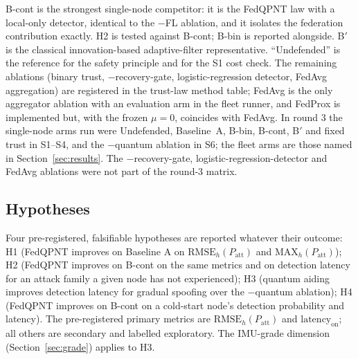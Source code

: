\documentclass[journal]{IEEEtran}
\begin{document}
B-cont is the strongest single-node competitor: it is the FedQPNT law with a local-only detector, identical to
the $-$FL ablation, and it isolates the federation contribution exactly. H2 is tested against B-cont;
B-bin is reported alongside. B$'$ is the classical innovation-based adaptive-filter representative.
``Undefended'' is the reference for the safety principle and for the S1 cost check. The remaining
ablations (binary trust, $-$recovery-gate, logistic-regression detector, FedAvg aggregation) are registered in
the trust-law method table; FedAvg is the only aggregator ablation with an evaluation arm in the fleet
runner, and FedProx is implemented but, with the frozen $\mu = 0$, coincides with FedAvg.
In round 3 the single-node arms run were Undefended, Baseline~A, B-bin, B-cont, B$'$ and fixed trust in S1--S4, and the $-$quantum ablation in S6; the fleet arms are those named in Section~\ref{sec:results}. The $-$recovery-gate, logistic-regression-detector and FedAvg ablations were not part of the round-3 matrix.

\subsection{Hypotheses}
\label{sec:hypotheses}
Four pre-registered, falsifiable hypotheses are reported whatever their outcome:
H1 (FedQPNT improves on Baseline A on $\mathrm{RMSE}_h(P_{\mathrm{att}})$ and $\mathrm{MAX}_h(P_{\mathrm{att}})$);
H2 (FedQPNT improves on B-cont on the same metrics and on detection latency for an attack family a given
node has not experienced); H3 (quantum aiding improves detection latency for gradual spoofing over the
$-$quantum ablation); H4 (FedQPNT improves on B-cont on a cold-start node's detection probability and
latency). The pre-registered primary metrics are $\mathrm{RMSE}_h(P_{\mathrm{att}})$ and
$\mathrm{latency}_{\mathrm{on}}$; all others are secondary and labelled exploratory. The IMU-grade dimension
(Section~\ref{sec:grade}) applies to H3.

\end{document}
